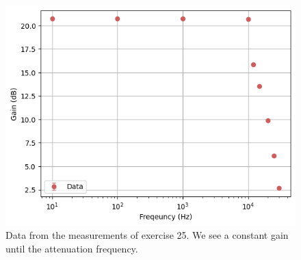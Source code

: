\documentclass[%
reprint,
amsmath,amssymb,
aps,
floatfix
]{revtex4-2}
\begin{document}
		\begin{table}[]
			\caption{The data measured using the oscilloscope for exercise 25 with the inclusion of the $1\,\mu\text{F}$ capacitor.}
			\label{tab:ex25ResultsWithCapacitor}
		\end{table}
		
		\begin{figure}
			\includegraphics[width=0.85\columnwidth]{ex25Results.png}
			\caption{\label{fig:ex25Results}Data from the measurements of exercise 25. We see a constant gain until the attenuation frequency.}
		\end{figure}
		
\end{document}
